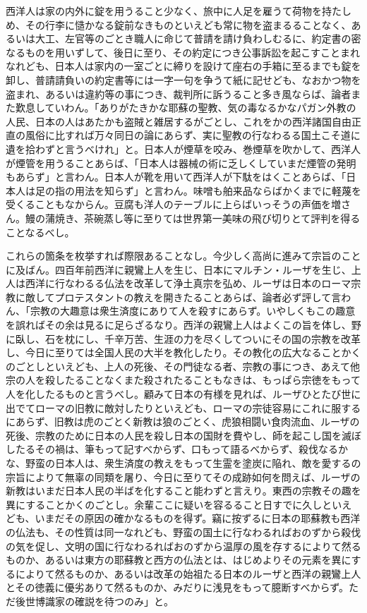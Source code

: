 \documentclass[a4paper, platex, dvipdfmx]{jsarticle}
\begin{document}
西洋人は家の内外に錠を用うること少なく、旅中に人足を雇うて荷物を持たしめ、その行李に慥かなる錠前なきものといえども常に物を盗まるることなく、あるいは大工、左官等のごとき職人に命じて普請を請け負わしむるに、約定書の密なるものを用いずして、後日に至り、その約定につき公事訴訟を起こすことまれなれども、日本人は家内の一室ごとに締りを設けて座右の手箱に至るまでも錠を卸し、普請請負いの約定書等には一字一句を争うて紙に記せども、なおかつ物を盗まれ、あるいは違約等の事につき、裁判所に訴うること多き風ならば、論者また歎息していわん。「ありがたきかな耶蘇の聖教、気の毒なるかなパガン外教の人民、日本の人はあたかも盗賊と雑居するがごとし、これをかの西洋諸国自由正直の風俗に比すれば万々同日の論にあらず、実に聖教の行なわるる国土こそ道に遺を拾わずと言うべけれ」と。日本人が煙草を咬み、巻煙草を吹かして、西洋人が煙管を用うることあらば、「日本人は器械の術に乏しくしていまだ煙管の発明もあらず」と言わん。日本人が靴を用いて西洋人が下駄をはくことあらば、「日本人は足の指の用法を知らず」と言わん。味噌も舶来品ならばかくまでに軽蔑を受くることもなからん。豆腐も洋人のテーブルに上らばいっそうの声価を増さん。鰻の蒲焼き、茶碗蒸し等に至りては世界第一美味の飛び切りとて評判を得ることなるべし。

これらの箇条を枚挙すれば際限あることなし。今少しく高尚に進みて宗旨のことに及ばん。四百年前西洋に親鸞上人を生じ、日本にマルチン・ルーザを生じ、上人は西洋に行なわるる仏法を改革して浄土真宗を弘め、ルーザは日本のローマ宗教に敵してプロテスタントの教えを開きたることあらば、論者必ず評して言わん、「宗教の大趣意は衆生済度にありて人を殺すにあらず。いやしくもこの趣意を誤ればその余は見るに足らざるなり。西洋の親鸞上人はよくこの旨を体し、野に臥し、石を枕にし、千辛万苦、生涯の力を尽くしてついにその国の宗教を改革し、今日に至りては全国人民の大半を教化したり。その教化の広大なることかくのごとしといえども、上人の死後、その門徒なる者、宗教の事につき、あえて他宗の人を殺したることなくまた殺されたることもなきは、もっぱら宗徳をもって人を化したるものと言うべし。顧みて日本の有様を見れば、ルーザひとたび世に出でてローマの旧教に敵対したりといえども、ローマの宗徒容易にこれに服するにあらず、旧教は虎のごとく新教は狼のごとく、虎狼相闘い食肉流血、ルーザの死後、宗教のために日本の人民を殺し日本の国財を費やし、師を起こし国を滅ぼしたるその禍は、筆もって記すべからず、口もって語るべからず、殺伐なるかな、野蛮の日本人は、衆生済度の教えをもって生霊を塗炭に陥れ、敵を愛するの宗旨によりて無辜の同類を屠り、今日に至りてその成跡如何を問えば、ルーザの新教はいまだ日本人民の半ばを化すること能わずと言えり。東西の宗教その趣を異にすることかくのごとし。余輩ここに疑いを容るること日すでに久しといえども、いまだその原因の確かなるものを得ず。竊に按ずるに日本の耶蘇教も西洋の仏法も、その性質は同一なれども、野蛮の国土に行なわるればおのずから殺伐の気を促し、文明の国に行なわるればおのずから温厚の風を存するによりて然るものか、あるいは東方の耶蘇教と西方の仏法とは、はじめよりその元素を異にするによりて然るものか、あるいは改革の始祖たる日本のルーザと西洋の親鸞上人とその徳義に優劣ありて然るものか、みだりに浅見をもって臆断すべからず。ただ後世博識家の確説を待つのみ」と。
\end{document}
